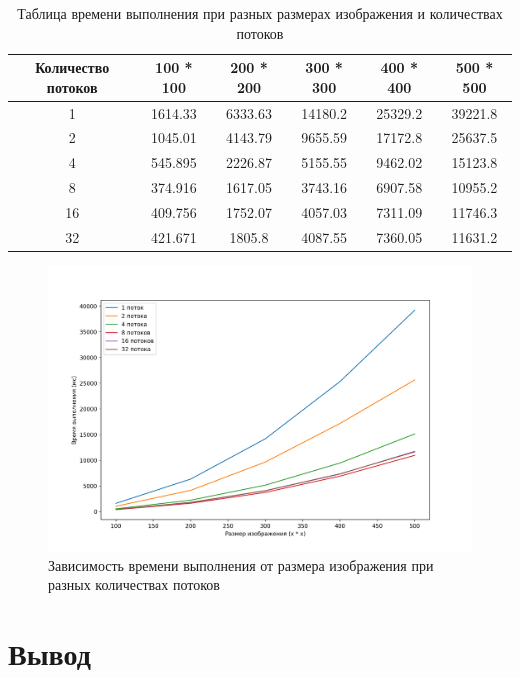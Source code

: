 \documentclass[12pt]{report}
\begin{document}
\begin{table} [h!]
    \label{tableComp}
	\caption{Таблица времени выполнения при разных размерах изображения и количествах потоков}
	\begin{center}
		\begin{tabular}{|c c c c c c|} 
			\hline
			Количество потоков &  100 * 100 & 200 * 200 & 300 * 300 & 400 * 400 & 500 * 500 \\  
            \hline
            1 & 1614.33 & 6333.63 & 14180.2 & 25329.2 & 39221.8\\
            \hline
            2 & 1045.01 & 4143.79 & 9655.59 & 17172.8 & 25637.5\\
            \hline
            4 & 545.895 & 2226.87 & 5155.55 & 9462.02 & 15123.8\\
            \hline
            8 & 374.916 & 1617.05 & 3743.16 & 6907.58 & 10955.2\\
            \hline
            16 & 409.756 & 1752.07 & 4057.03 & 7311.09 & 11746.3\\
            \hline
            32 & 421.671 & 1805.8 & 4087.55 & 7360.05 & 11631.2\\
			\hline
		\end{tabular}
	\end{center}
\end{table}
\newpage
\begin{figure}[h!p]
	\centering
	\includegraphics[scale = 0.8]{threadsComp.png}
	\caption{Зависимость времени выполнения от размера изображения при разных количествах потоков}
	\label{imageComp}
\end{figure}

\section{Вывод}
\end{document}
